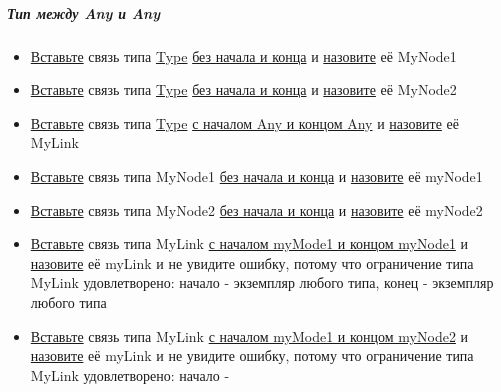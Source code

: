 \documentclass{article}
\begin{document}
\subparagraph{Тип между Any и Any}
\begin{itemize}
      \item \hyperlink{DeepCase.InsertLink.Description}{Вставьте} связь типа
            \hyperlink{Core.Type.Description}{Type}
            \hyperlink{FAQ.HowToInsertLinkWithoutFromAndTo}{без
                  начала и конца} и \hyperlink{FAQ.HowToSetName}{назовите} её
            MyNode1
      \item \hyperlink{DeepCase.InsertLink.Description}{Вставьте} связь типа
            \hyperlink{Core.Type.Description}{Type}
            \hyperlink{FAQ.HowToInsertLinkWithoutFromAndTo}{без
                  начала и конца} и \hyperlink{FAQ.HowToSetName}{назовите} её
            MyNode2
      \item \hyperlink{DeepCase.InsertLink.Description}{Вставьте} связь типа
            \hyperlink{Core.Type.Description}{Type}
            \hyperlink{FAQ.HowToInsertLinkWithFromAndTo}{с
                  началом Any и концом Any} и
            \hyperlink{FAQ.HowToSetName}{назовите} её
            MyLink
      \item \hyperlink{DeepCase.InsertLink.Description}{Вставьте} связь типа
            MyNode1
            \hyperlink{FAQ.HowToInsertLinkWithoutFromAndTo}{без начала и конца}
            и
            \hyperlink{FAQ.HowToSetName}{назовите} её myNode1
      \item \hyperlink{DeepCase.InsertLink.Description}{Вставьте} связь типа
            MyNode2
            \hyperlink{FAQ.HowToInsertLinkWithoutFromAndTo}{без начала и конца}
            и
            \hyperlink{FAQ.HowToSetName}{назовите} её myNode2
      \item \hyperlink{DeepCase.InsertLink.Description}{Вставьте} связь типа
            MyLink
            \hyperlink{FAQ.HowToInsertLinkWithFromAndTo}{с началом myMode1 и
                  концом
                  myNode1} и \hyperlink{FAQ.HowToSetName}{назовите} её myLink и
            не
            увидите
            ошибку, потому что ограничение типа MyLink удовлетворено: начало -
            экземпляр
            любого типа, конец - экземпляр любого типа
      \item \hyperlink{DeepCase.InsertLink.Description}{Вставьте} связь типа
            MyLink
            \hyperlink{FAQ.HowToInsertLinkWithFromAndTo}{с началом myMode1 и
                  концом
                  myNode2} и \hyperlink{FAQ.HowToSetName}{назовите} её myLink и
            не
            увидите
            ошибку, потому что ограничение типа MyLink удовлетворено: начало -

\end{itemize}
\end{document}
